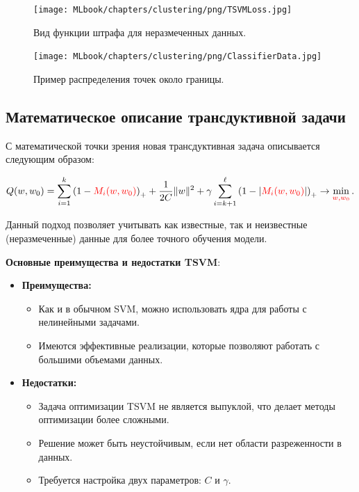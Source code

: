 \begin{itemize}
    \begin{figure}[ht]
    \centering
    \texttt{[image: MLbook/chapters/clustering/png/TSVMLoss.jpg]}
    \caption{Вид функции штрафа для неразмеченных данных.}
    \end{figure}

\begin{figure}[ht]
    \centering
    \texttt{[image: MLbook/chapters/clustering/png/ClassifierData.jpg]}
    \caption{Пример распределения точек около границы.}
\end{figure}

\subsection{Математическое описание трансдуктивной задачи}
С математической точки зрения новая трансдуктивная задача описывается следующим образом:

\begin{equation}
    Q(w, w_0) = \sum_{i=1}^{k} \left( 1 - \textcolor{red}{M_i(w, w_0)} \right)_+ + \frac{1}{2C} \|w\|^2 + \gamma \sum_{i=k+1}^{\ell} \left( 1 - |\textcolor{red}{M_i(w, w_0)}| \right)_+ \to \min_{\textcolor{red}{w, w_0}}.
\end{equation}

Данный подход позволяет учитывать как известные, так и неизвестные (неразмеченные) данные для более точного обучения модели.

\textbf{Основные преимущества и недостатки TSVM}:
\begin{itemize} 
    \item \textbf{Преимущества:} 
    \begin{itemize} 
        \item Как и в обычном SVM, можно использовать ядра для работы с нелинейными задачами. 
        \item Имеются эффективные реализации, которые позволяют работать с большими объемами данных. 
    \end{itemize}
        
    \item \textbf{Недостатки:}
    \begin{itemize}
        \item Задача оптимизации TSVM не является выпуклой, что делает методы оптимизации более сложными.
        \item Решение может быть неустойчивым, если нет области разреженности в данных.
        \item Требуется настройка двух параметров: \( C \) и \( \gamma \).
    \end{itemize}


\end{itemize}
\end{itemize}
